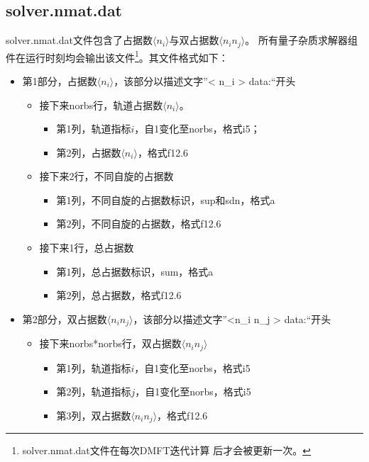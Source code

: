 \subsection{solver.nmat.dat}
solver.nmat.dat文件包含了占据数$\langle n_{i}\rangle$与双占据数$\langle n_{i} n_{j} \rangle$。
所有量子杂质求解器组件在运行时刻均会输出该文件\footnote{solver.nmat.dat文件在每次DMFT迭代计算
后才会被更新一次。}。其文件格式如下：
\begin{itemize}
\item 第1部分，占据数$\langle n_{i}\rangle$，该部分以描述文字”< n\_i >   data:“开头
  \begin{itemize}
  \item 接下来norbs行，轨道占据数$\langle n_{i}\rangle$。
    \begin{itemize}
    \item 第1列，轨道指标$i$，自1变化至norbs，格式i5； 
    \item 第2列，占据数$\langle n_{i}\rangle$，格式f12.6
    \end{itemize}
  \item 接下来2行，不同自旋的占据数
    \begin{itemize}
    \item 第1列，不同自旋的占据数标识，sup和sdn，格式a
    \item 第2列，不同自旋的占据数，格式f12.6
    \end{itemize}
  \item 接下来1行，总占据数
    \begin{itemize}
    \item 第1列，总占据数标识，sum，格式a
    \item 第2列，总占据数，格式f12.6
    \end{itemize}
  \end{itemize}

\item 第2部分，双占据数$\langle n_{i} n_{j} \rangle$，该部分以描述文字”<n\_i n\_j > data:“开头
  \begin{itemize}
  \item 接下来norbs*norbs行，双占据数$\langle n_{i} n_{j} \rangle$
    \begin{itemize}
    \item 第1列，轨道指标$i$，自1变化至norbs，格式i5
    \item 第2列，轨道指标$j$，自1变化至norbs，格式i5
    \item 第3列，双占据数$\langle n_{i} n_{j} \rangle$，格式f12.6
    \end{itemize}
  \end{itemize}
\end{itemize}

